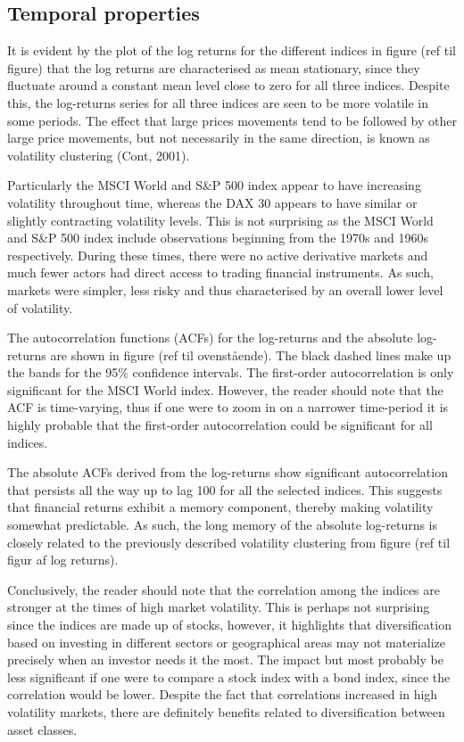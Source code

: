 

\label{subsection: distributional properties}

 
\subsection{Temporal properties}
\label{subsection: temporal properties}
It is evident by the plot of the log returns for the different indices in figure (ref til figure) that the log returns are characterised as mean stationary, since they fluctuate around a constant mean level close to zero for all three indices. Despite this, the log-returns series for all three indices are seen to be more volatile in some periods. The effect that large prices movements tend to be followed by other large price movements, but not necessarily in the same direction, is known as volatility clustering (Cont, 2001). 

Particularly the MSCI World and S\&P 500 index appear to have increasing volatility throughout time, whereas the DAX 30 appears to have similar or slightly contracting volatility levels. This is not surprising as the MSCI World and S\&P 500 index include observations beginning from the 1970s and 1960s respectively. During these times, there were no active derivative markets and much fewer actors had direct access to trading financial instruments. As such, markets were simpler, less risky and thus characterised by an overall lower level of volatility. 


The autocorrelation functions (ACFs) for the log-returns and the absolute log-
returns are shown in figure (ref til ovenstående). The black dashed lines make up the bands for the 95\% confidence intervals. The first-order autocorrelation is only significant for the MSCI World index. However, the reader should note that the ACF is time-varying, thus if one were to zoom in on a narrower time-period it is highly probable that the first-order autocorrelation could be significant for all indices. 

The absolute ACFs derived from the log-returns show significant autocorrelation that persists all the way up to lag 100 for all the selected indices. This suggests that financial returns exhibit a memory component, thereby making volatility somewhat predictable. As such, the long memory of the absolute log-returns is closely related to the previously described volatility clustering from figure (ref til figur af log returns).

Conclusively, the reader should note that the correlation among the indices are stronger at the times of high market volatility. This is perhaps not surprising since the indices are made up of stocks, however, it highlights that diversification based on investing in different sectors or geographical areas may not materialize precisely when an investor needs it the most. The impact but most probably be less significant if one were to compare a stock index with a bond index, since the correlation would be lower. Despite the fact that correlations increased in high volatility markets, there are definitely benefits related to diversification between asset classes.